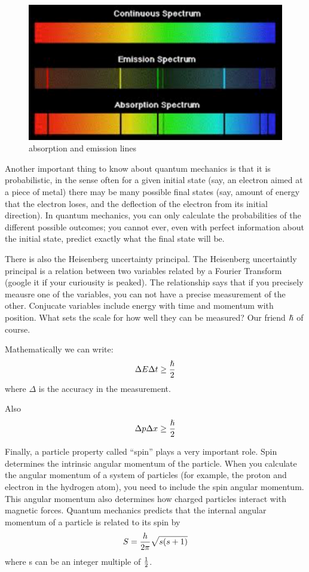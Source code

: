 \begin{figure}[h]
\centering\includegraphics[scale=0.5]{./ElementaryParticles/Pictures/fig6.pdf}
\caption{absorption and emission lines}
\label{fig:light}
\end{figure}


Another important thing to know about quantum mechanics is that it is probabilistic, in the sense often for a given initial state (say, an electron aimed at a piece of metal) there may be many possible final states (say, amount of energy that the electron loses, and the deflection of the electron from its initial direction).  In quantum mechanics, you can only calculate the probabilities of the different possible outcomes; you cannot ever, even with perfect information about the initial state, predict exactly what the final state will be.

There is also the Heisenberg uncertainty principal.  The Heisenberg uncertaintly principal is a relation between two variables related by a Fourier Transform (google it if your curiousity is peaked).  The relationship says that if you precisely meausre one of the variables, you can not have a precise measurement of the other.   Conjucate variables include energy with time and momentum with position.  What sets the scale for how well they can be measured?  Our friend ${\rm \hslash}$ of course.

Mathematically we can write:
\begin{equation}
\Delta E \Delta t \ge {\hslash \over 2}
\end{equation} 
where $\Delta$ is the accuracy in the measurement.

Also
\begin{equation}
\Delta p \Delta x \ge {\hslash \over 2}
\end{equation} 

Finally, a particle property called ``spin'' plays a very important role.
Spin determines the intrinsic angular momentum of the particle.  When you calculate the angular momentum of a system of particles (for example, the proton and electron in the hydrogen atom), you need to include the spin angular momentum.  This angular momentum also determines how charged particles interact with magnetic forces.  Quantum mechanics predicts that the internal angular momentum of a particle is related to its spin by
\begin{equation}
S={h \over {2 \pi}}\sqrt{s(s+1)}
\end{equation}
where s can be an integer multiple of $1 \over 2$.

